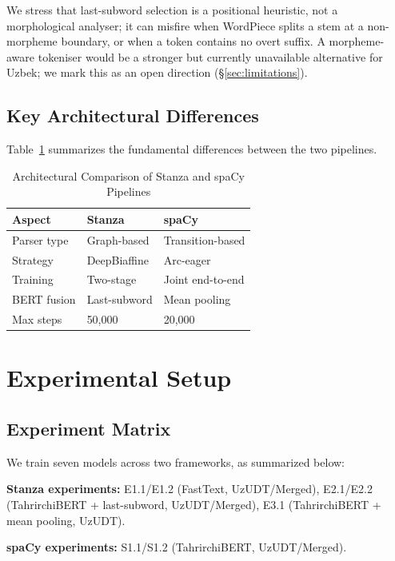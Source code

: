 \documentclass[10pt,conference,a4paper]{IEEEtran_EDM}
\begin{document}
We stress that last-subword selection is a positional heuristic, not a morphological analyser; it can misfire when WordPiece splits a stem at a non-morpheme boundary, or when a token contains no overt suffix. A morpheme-aware tokeniser would be a stronger but currently unavailable alternative for Uzbek; we mark this as an open direction (\S\ref{sec:limitations}).

\subsection{Key Architectural Differences}

Table~\ref{tab:arch_diff} summarizes the fundamental differences between the two pipelines.

\begin{table}[htbp]
\caption{Architectural Comparison of Stanza and spaCy Pipelines}
\begin{center}
\begin{tabular}{lll}
\toprule
\textbf{Aspect} & \textbf{Stanza} & \textbf{spaCy} \\
\midrule
Parser type & Graph-based & Transition-based \\
Strategy & DeepBiaffine & Arc-eager \\
Training & Two-stage & Joint end-to-end \\
BERT fusion & Last-subword & Mean pooling \\
Max steps & 50,000 & 20,000 \\
\bottomrule
\end{tabular}
\label{tab:arch_diff}
\end{center}
\end{table}

\section{Experimental Setup}

\subsection{Experiment Matrix}

We train seven models across two frameworks, as summarized below:

\textbf{Stanza experiments:} E1.1/E1.2 (FastText, UzUDT/Merged), E2.1/E2.2 (TahrirchiBERT + last-subword, UzUDT/Merged), E3.1 (TahrirchiBERT + mean pooling, UzUDT).

\textbf{spaCy experiments:} S1.1/S1.2 (TahrirchiBERT, UzUDT/Merged).
\end{document}
